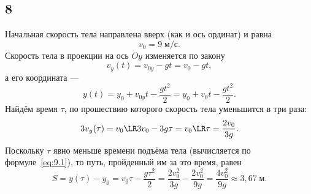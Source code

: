 \subsection{8}

Начальная скорость тела направлена вверх (как и ось ординат) и равна
\[
v_0=9\;\text{м/с}.
\]
Скорость тела в проекции на ось $Oy$ изменяется по закону
\begin{equation}\label{eq:8.1}
v_y(t)=v_{0y}-gt=v_0-gt,
\end{equation}
а его координата ---
\begin{equation}\label{eq:8.2}
y(t)=y_0+v_{0y}t-\frac{gt^2}{2}=y_0+v_0t-\frac{gt^2}{2}.
\end{equation}
Найдём время $\tau$, по прошествию которого скорость тела уменьшится в три раза:
\[
3v_y(\tau)=v_0\LR 3v_0-3g\tau=v_0\LR\tau=\frac{2v_0}{3g}.
\]
Поскольку $\tau$ явно меньше времени подъёма тела (вычисляется по формуле~\eqref{eq:9.1}), то путь, пройденный им за это время, равен
\[
S=y(\tau)-y_0=v_0\tau-\frac{g\tau^2}{2}=\frac{2v_0^2}{3g}-\frac{2v_0^2}{9g}=\frac{4v_0^2}{9g}\approx3{,}67\;\text{м}.
\]